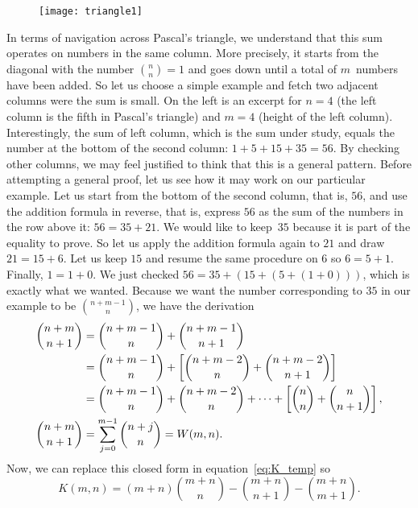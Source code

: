 %
\begin{wrapfigure}[6]{l}[0pt]{0pt}
\centering
\texttt{[image: triangle1]}%
\end{wrapfigure}
In terms of navigation across Pascal's triangle, we understand that
this sum operates on numbers in the same column. More precisely, it
starts from the diagonal with the number \(\binom{n}{n} = 1\) and goes
down until a total of \(m\)~numbers have been added. So let us choose
a simple example and fetch two adjacent columns were the sum is
small. On the left is an excerpt for \(n=4\) (the left column is the
fifth in Pascal's triangle) and \(m=4\) (height of the left
column). Interestingly, the sum of left column, which is the sum under
study, equals the number at the bottom of the second column: \(1 + 5 +
15 + 35 = 56\). By checking other columns, we may feel justified to
think that this is a general pattern. Before attempting a general
proof, let us see how it may work on our particular example. Let us
start from the bottom of the second column, that is, \(56\), and use
the addition formula in reverse, that is, express \(56\) as the sum of
the numbers in the row above it: \(56 = 35 + 21\).  We would like to
keep~\(35\) because it is part of the equality to prove. So let us
apply the addition formula again to \(21\) and draw \(21 = 15 +
6\). Let us keep \(15\) and resume the same procedure on \(6\) so \(6
= 5 + 1\). Finally, \(1 = 1 + 0\). We just checked \(56 = 35 + (15 +
(5 + (1 + 0)))\), which is exactly what we wanted. Because we want the
number corresponding to \(35\) in our example to be
\(\binom{n+m-1}{n}\), we have the derivation
\begin{align}
\binom{n+m}{n+1}
  &= \binom{n+m-1}{n} + \binom{n+m-1}{n+1}\notag\\
  &= \binom{n+m-1}{n} + \left[\binom{n+m-2}{n} +
     \binom{n+m-2}{n+1}\right]\notag\\
  &= \binom{n+m-1}{n} + \binom{n+m-2}{n} + \dots +
     \left[\binom{n}{n} + \binom{n}{n+1}\right],\notag\\
\binom{n+m}{n+1}
  &= \sum_{j=0}^{m-1}{\binom{n+j}{n}} = W(m,n).
\label{eq:binom_sum}
\end{align}
Now, we can replace this closed form in equation~\eqref{eq:K_temp}
 so
\begin{equation*}
K(m,n) = (m + n)
\binom{m+n}{n} - \binom{m+n}{n+1} - \binom{m+n}{m+1}.
\end{equation*}
